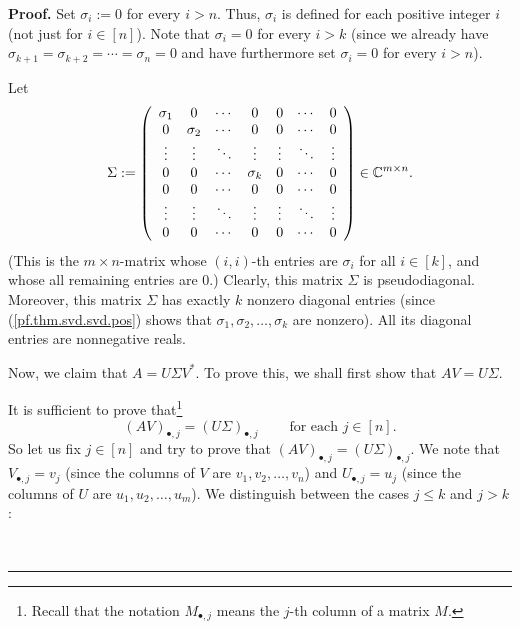 \documentclass[numbers=enddot,12pt,final,onecolumn,notitlepage]{scrartcl}%
\numberwithin{exer}{subsection}
\theoremstyle{definition}
\newenvironment{proof}[1][Proof]{\noindent\textbf{#1.} }{\ \rule{0.5em}{0.5em}}
\newenvironment{noncompile}{}{}
\begin{document}
\begin{proof}
\begin{noncompile}
Set $\sigma_{i}:=0$ for every $i>n$. Thus, $\sigma_{i}$ is defined for each
positive integer $i$ (not just for $i\in\left[  n\right]  $). Note that
$\sigma_{i}=0$ for every $i>k$ (since we already have $\sigma_{k+1}%
=\sigma_{k+2}=\cdots=\sigma_{n}=0$ and have furthermore set $\sigma_{i}=0$ for
every $i>n$).
\end{noncompile}

Let%
\[
\Sigma:=\left(
\begin{array}
[c]{ccccccc}%
\sigma_{1} & 0 & \cdots & 0 & 0 & \cdots & 0\\
0 & \sigma_{2} & \cdots & 0 & 0 & \cdots & 0\\
\vdots & \vdots & \ddots & \vdots & \vdots & \ddots & \vdots\\
0 & 0 & \cdots & \sigma_{k} & 0 & \cdots & 0\\
0 & 0 & \cdots & 0 & 0 & \cdots & 0\\
\vdots & \vdots & \ddots & \vdots & \vdots & \ddots & \vdots\\
0 & 0 & \cdots & 0 & 0 & \cdots & 0
\end{array}
\right)  \in\mathbb{C}^{m\times n}.
\]
(This is the $m\times n$-matrix whose $\left(  i,i\right)  $-th entries are
$\sigma_{i}$ for all $i\in\left[  k\right]  $, and whose all remaining entries
are $0$.) Clearly, this matrix $\Sigma$ is pseudodiagonal. Moreover, this
matrix $\Sigma$ has exactly $k$ nonzero diagonal entries (since
(\ref{pf.thm.svd.svd.pos}) shows that $\sigma_{1},\sigma_{2},\ldots,\sigma
_{k}$ are nonzero). All its diagonal entries are nonnegative reals.

Now, we claim that $A=U\Sigma V^{\ast}$. To prove this, we shall first show
that $AV=U\Sigma$.

It is sufficient to prove that\footnote{Recall that the notation
$M_{\bullet,j}$ means the $j$-th column of a matrix $M$.}%
\[
\left(  AV\right)  _{\bullet,j}=\left(  U\Sigma\right)  _{\bullet
,j}\ \ \ \ \ \ \ \ \ \ \text{for each }j\in\left[  n\right]  .
\]
So let us fix $j\in\left[  n\right]  $ and try to prove that $\left(
AV\right)  _{\bullet,j}=\left(  U\Sigma\right)  _{\bullet,j}$. We note that
$V_{\bullet,j}=v_{j}$ (since the columns of $V$ are $v_{1},v_{2},\ldots,v_{n}%
$) and $U_{\bullet,j}=u_{j}$ (since the columns of $U$ are $u_{1},u_{2}%
,\ldots,u_{m}$). We distinguish between the cases $j\leq k$ and $j>k$:


\end{proof}
\end{document}
